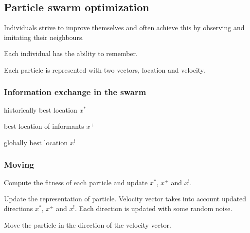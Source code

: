 \documentclass{article}
\begin{document}
\begin{multicols*}{2}
{\subsection{Particle swarm optimization}
\begin{compactitem}
	\item Individuals strive to improve themselves and often achieve this by observing and imitating their neighbours.
	\item Each individual has the ability to remember.
	\item Each particle is represented with two vectors, location and velocity.
\end{compactitem}
\subsubsection{Information exchange in the swarm}
\begin{compactitem}
	\item historically best location $x^*$
	\item best location of informants $x^+$
	\item globally best location $x^!$
\end{compactitem}
\subsubsection{Moving}
\begin{compactitem}
	\item Compute the fitness of each particle and update $x^*$, $x^+$ and $x^!$.
	\item Update the representation of particle.
	Velocity vector takes into account updated directions $x^*$, $x^+$ and $x^!$.
	Each direction is updated with some random noise.
	\item Move the particle in the direction of the velocity vector.
\end{compactitem}

}
\end{multicols*}
\end{document}
